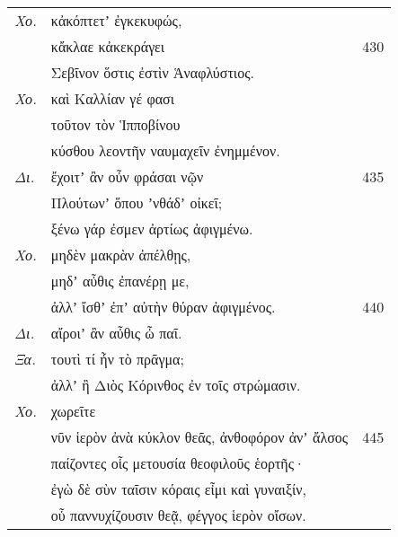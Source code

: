 \documentclass[13pt]{article}
\begin{document}
\begin{greek}
\newpage
\begin{spacing}{1.5}
\begin{tabularx}{\textwidth}{@{}lXr@{}}
\textit{Χο.} & κἀκόπτετʼ ἐγκεκυφώς, &  \\
& κἄκλαε κἀκεκράγει & 430 \\
& Σεβῖνον ὅστις ἐστὶν Ἁναφλύστιος. &  \\
\textit{Χο.} & καὶ Καλλίαν γέ φασι &  \\
& τοῦτον τὸν Ἱπποβίνου &  \\
& κύσθου λεοντῆν ναυμαχεῖν ἐνημμένον. &  \\
\textit{Δι.} & ἔχοιτʼ ἂν οὖν φράσαι νῷν & 435 \\
& Πλούτωνʼ ὅπου ʼνθάδʼ οἰκεῖ; &  \\
& ξένω γάρ ἐσμεν ἀρτίως ἀφιγμένω. &  \\
\textit{Χο.} & μηδὲν μακρὰν ἀπέλθῃς, &  \\
& μηδʼ αὖθις ἐπανέρῃ με, &  \\
& ἀλλʼ ἴσθʼ ἐπʼ αὐτὴν θύραν ἀφιγμένος. & 440 \\
\textit{Δι.} & αἴροιʼ ἂν αὖθις ὦ παῖ. &  \\
\textit{Ξα.} & τουτὶ τί ἦν τὸ πρᾶγμα; &  \\
& ἀλλʼ ἢ Διὸς Κόρινθος ἐν τοῖς στρώμασιν. &  \\
\textit{Χο.} & χωρεῖτε &  \\
& νῦν ἱερὸν ἀνὰ κύκλον θεᾶς, ἀνθοφόρον ἀνʼ ἄλσος & 445 \\
& παίζοντες οἷς μετουσία θεοφιλοῦς ἑορτῆς· &  \\
& ἐγὼ δὲ σὺν ταῖσιν κόραις εἶμι καὶ γυναιξίν, &  \\
& οὗ παννυχίζουσιν θεᾷ, φέγγος ἱερὸν οἴσων. &  \\

\end{tabularx}
\end{spacing}


\end{greek}
\end{document}

